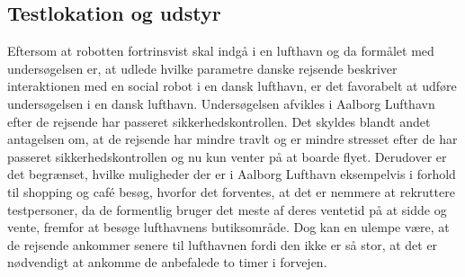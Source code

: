 \subsection*{Testlokation og udstyr}
\label{TestlokationOgUdstyr}
%
Eftersom at robotten fortrinsvist skal indgå i en lufthavn og da formålet med undersøgelsen er, at udlede hvilke parametre danske rejsende beskriver interaktionen med en social robot i en dansk lufthavn, er det favorabelt at udføre undersøgelsen i en dansk lufthavn. Undersøgelsen afvikles i Aalborg Lufthavn efter de rejsende har passeret sikkerhedskontrollen. Det skyldes blandt andet antagelsen om, at de rejsende har mindre travlt og er mindre stresset efter de har passeret sikkerhedskontrollen og nu kun venter på at boarde flyet. Derudover er det begrænset, hvilke muligheder der er i Aalborg Lufthavn eksempelvis i forhold til shopping og café besøg, hvorfor det forventes, at det er nemmere at rekruttere testpersoner, da de formentlig bruger det meste af deres ventetid på at sidde og vente, fremfor at besøge lufthavnens butiksområde. Dog kan en ulempe være, at de rejsende ankommer senere til lufthavnen fordi den ikke er så stor, at det er nødvendigt at ankomme de anbefalede to timer i forvejen.

